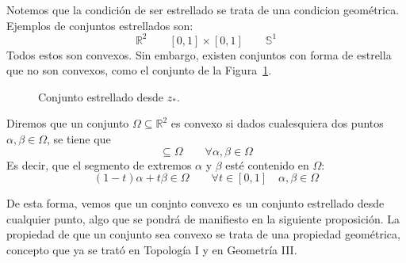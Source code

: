 Notemos que la condición de ser estrellado se trata de una condicion geométrica. Ejemplos de conjuntos estrellados son:
\begin{equation*}
    \mathbb{R}^2 \qquad [0,1]\times [0,1] \qquad \mathbb{S}^1
\end{equation*}
Todos estos son convexos. Sin embargo, existen conjuntos con forma de estrella que no son convexos, como el conjunto de la Figura~\ref{fig:Estrellado}.
\begin{figure}[H]
    \centering
    \caption{Conjunto estrellado desde $z_\ast$.}
    \label{fig:Estrellado}
\end{figure}

\begin{definicion}[Convexo]
    Diremos que un conjunto $\Omega\subseteq \mathbb{R}^2$ es convexo si dados cualesquiera dos puntos $\alpha,\beta\in \Omega$, se tiene que 
    \begin{equation*}
        [\alpha,\beta] \subseteq \Omega \qquad \forall \alpha,\beta\in \Omega
    \end{equation*}
    Es decir, que el segmento de extremos $\alpha$ y $\beta$ esté contenido en $\Omega$:
    \begin{equation*}
        (1-t)\alpha+t\beta \in \Omega \qquad \forall t\in [0,1] \quad \alpha,\beta\in \Omega
    \end{equation*}
\end{definicion}
De esta forma, vemos que un conjnto convexo es un conjunto estrellado desde cualquier punto, algo que se pondrá de manifiesto en la siguiente proposición.
La propiedad de que un conjunto sea convexo se trata de una propiedad geométrica, concepto que ya se trató en Topología I y en Geometría III\@.

